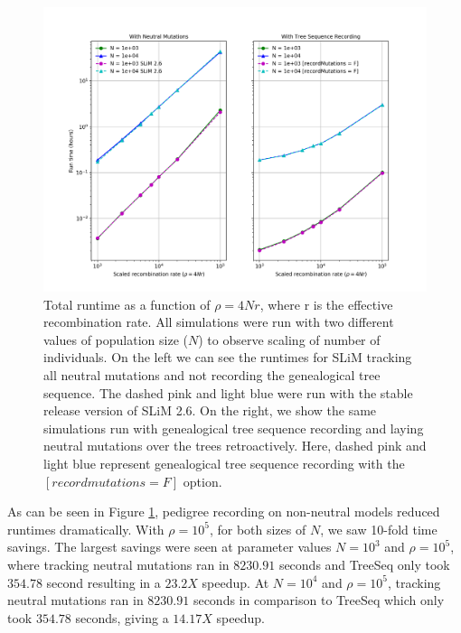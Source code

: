 \documentclass{article}
\begin{document}
\begin{figure}[h!tb]
	\begin{center}
  		\includegraphics[width=1.0\linewidth]{../figures/RuntimeLog.png}
  		\caption{
		Total runtime as a function of $\rho = 4Nr$, where r is the effective recombination rate.
		All simulations were run with two different values of population size ($N$) to observe scaling of number of individuals.
		On the left we can see the runtimes for SLiM tracking all neutral mutations 
		and not recording the genealogical tree sequence.
		The dashed pink and light blue were run with the stable release version of SLiM 2.6.
		On the right, we show the same simulations run with genealogical tree sequence recording and laying 
		neutral mutations over the trees retroactively.
		Here, dashed pink and light blue represent genealogical tree sequence recording with the $[record mutations = F]$ option. 
		}
  		\label{fig:NonNeutralComp}
	\end{center}
\end{figure}


As can be seen in Figure \ref{fig:NonNeutralComp}, pedigree recording on non-neutral models reduced runtimes dramatically.
With $\rho = 10^{5}$, for both sizes of $N$, we saw 10-fold time savings.
The largest savings were seen at parameter values $N = 10^{3}$ and $\rho = 10^{5}$,
where tracking neutral mutations ran in $8230.91$ seconds and TreeSeq only took $354.78$ second
resulting in a $23.2X$ speedup. 
At $N = 10^{4}$ and $\rho = 10^{5}$,
tracking neutral mutations ran in $8230.91$ seconds in comparison to TreeSeq which only took $354.78$ seconds,
giving a $14.17X$ speedup. 
\end{document}
